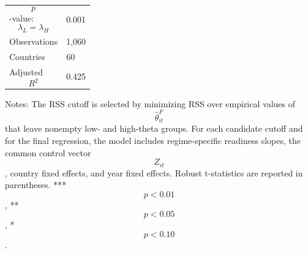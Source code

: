 \begin{table}[H]
\begin{threeparttable}
\begin{tabularx}{\textwidth}{lY}
$$p$$-value: $$\lambda_L=\lambda_H$$ & 0.001 \\
Observations & 1,060 \\
Countries & 60 \\
Adjusted $$R^2$$ & 0.425 \\
\bottomrule
\end{tabularx}
\begin{tablenotes}[flushleft]\footnotesize
\item Notes: The RSS cutoff is selected by minimizing RSS over empirical values of $$\widehat{\theta}^{F}_{it}$$ that leave nonempty low- and high-theta groups. For each candidate cutoff and for the final regression, the model includes regime-specific readiness slopes, the common control vector $$Z_{it}$$, country fixed effects, and year fixed effects. Robust t-statistics are reported in parentheses. *** $$p<0.01$$, ** $$p<0.05$$, * $$p<0.10$$.
\end{tablenotes}
\end{threeparttable}
\end{table}
